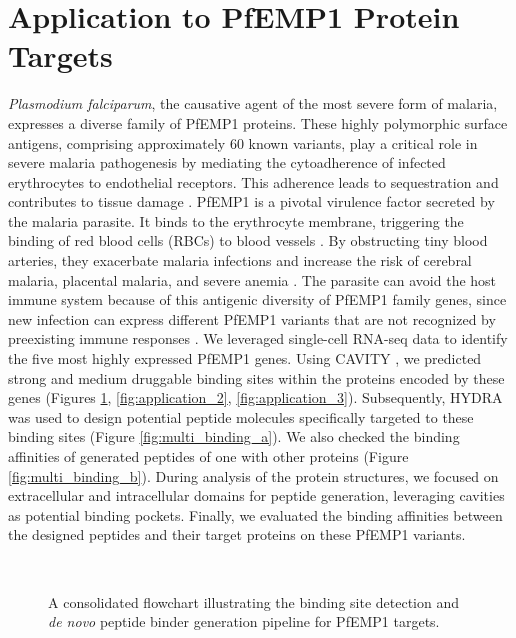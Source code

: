 \section{Application to PfEMP1 Protein Targets}
\textit{Plasmodium falciparum}, the causative agent of the most severe form of malaria, expresses a diverse family of PfEMP1 proteins. These highly polymorphic surface antigens, comprising approximately 60 known variants, play a critical role in severe malaria pathogenesis by mediating the cytoadherence of infected erythrocytes to endothelial receptors. This adherence leads to sequestration and contributes to tissue damage \cite{jensen2020cerebral}. PfEMP1 is a pivotal virulence factor secreted by the malaria parasite. It binds to the erythrocyte membrane, triggering the binding of red blood cells (RBCs) to blood vessels \cite{pasternak2009pfemp1}. By obstructing tiny blood arteries, they exacerbate malaria infections and increase the risk of cerebral malaria, placental malaria, and severe anemia \cite{jensen2020cerebral}. The parasite can avoid the host immune system because of this antigenic diversity of PfEMP1 family genes, since new infection can express different PfEMP1 variants that are not recognized by preexisting immune responses \cite{scherf2008antigenic}.
We leveraged single-cell RNA-seq data to identify the five most highly expressed PfEMP1 genes. Using CAVITY \cite{Yuan2013}, we predicted strong and medium druggable binding sites within the proteins encoded by these genes (Figures \ref{fig:application_1}, \ref{fig:application_2}, \ref{fig:application_3}). Subsequently, HYDRA was used to design potential peptide molecules specifically targeted to these binding sites (Figure \ref{fig:multi_binding_a}). We also checked the binding affinities of generated peptides of one with other proteins (Figure \ref{fig:multi_binding_b}).  During analysis of the protein structures, we focused on extracellular and intracellular domains for peptide generation, leveraging cavities as potential binding pockets. Finally, we evaluated the binding affinities between the designed peptides and their target proteins on these PfEMP1 variants.

\begin{figure}
  \center

   \\

  \caption{A consolidated flowchart illustrating the binding site detection and \textit{de novo} peptide binder generation pipeline for PfEMP1 targets.}

  \label{fig:application_1}
\end{figure}

